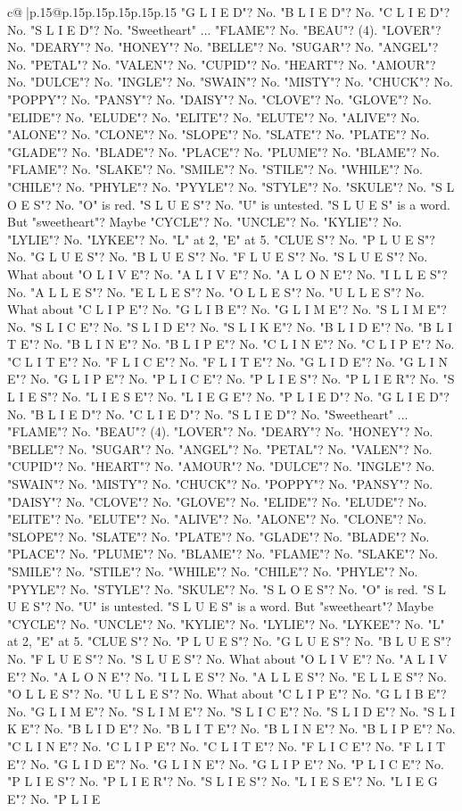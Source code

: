 \documentclass{article}
\begin{document}
{\begin{supertabular}{c@{$\;$}|p{.15\linewidth}@{}p{.15\linewidth}p{.15\linewidth}p{.15\linewidth}p{.15\linewidth}p{.15\linewidth}}
{{{"G L I E D"? No. "B L I E D"? No. "C L I E D"? No. "S L I E D"? No. "Sweetheart" ... "FLAME"? No. "BEAU"? (4). "LOVER"? No. "DEARY"? No. "HONEY"? No. "BELLE"? No. "SUGAR"? No. "ANGEL"? No. "PETAL"? No. "VALEN"? No. "CUPID"? No. "HEART"? No. "AMOUR"? No. "DULCE"? No. "INGLE"? No. "SWAIN"? No. "MISTY"? No. "CHUCK"? No. "POPPY"? No. "PANSY"? No. "DAISY"? No. "CLOVE"? No. "GLOVE"? No. "ELIDE"? No. "ELUDE"? No. "ELITE"? No. "ELUTE"? No. "ALIVE"? No. "ALONE"? No. "CLONE"? No. "SLOPE"? No. "SLATE"? No. "PLATE"? No. "GLADE"? No. "BLADE"? No. "PLACE"? No. "PLUME"? No. "BLAME"? No. "FLAME"? No. "SLAKE"? No. "SMILE"? No. "STILE"? No. "WHILE"? No. "CHILE"? No. "PHYLE"? No. "PYYLE"? No. "STYLE"? No. "SKULE"? No. "S L O E S"? No. "O" is red. "S L U E S"? No. "U" is untested. "S L U E S" is a word. But "sweetheart"? Maybe "CYCLE"? No. "UNCLE"? No. "KYLIE"? No. "LYLIE"? No. "LYKEE"? No. "L" at 2, "E" at 5. "CLUE S"? No. "P L U E S"? No. "G L U E S"? No. "B L U E S"? No. "F L U E S"? No. "S L U E S"? No. What about "O L I V E"? No. "A L I V E"? No. "A L O N E"? No. "I L L E S"? No. "A L L E S"? No. "E L L E S"? No. "O L L E S"? No. "U L L E S"? No. What about "C L I P E"? No. "G L I B E"? No. "G L I M E"? No. "S L I M E"? No. "S L I C E"? No. "S L I D E"? No. "S L I K E"? No. "B L I D E"? No. "B L I T E"? No. "B L I N E"? No. "B L I P E"? No. "C L I N E"? No. "C L I P E"? No. "C L I T E"? No. "F L I C E"? No. "F L I T E"? No. "G L I D E"? No. "G L I N E"? No. "G L I P E"? No. "P L I C E"? No. "P L I E S"? No. "P L I E R"? No. "S L I E S"? No. "L I E S E"? No. "L I E G E"? No. "P L I E D"? No. "G L I E D"? No. "B L I E D"? No. "C L I E D"? No. "S L I E D"? No. "Sweetheart" ... "FLAME"? No. "BEAU"? (4). "LOVER"? No. "DEARY"? No. "HONEY"? No. "BELLE"? No. "SUGAR"? No. "ANGEL"? No. "PETAL"? No. "VALEN"? No. "CUPID"? No. "HEART"? No. "AMOUR"? No. "DULCE"? No. "INGLE"? No. "SWAIN"? No. "MISTY"? No. "CHUCK"? No. "POPPY"? No. "PANSY"? No. "DAISY"? No. "CLOVE"? No. "GLOVE"? No. "ELIDE"? No. "ELUDE"? No. "ELITE"? No. "ELUTE"? No. "ALIVE"? No. "ALONE"? No. "CLONE"? No. "SLOPE"? No. "SLATE"? No. "PLATE"? No. "GLADE"? No. "BLADE"? No. "PLACE"? No. "PLUME"? No. "BLAME"? No. "FLAME"? No. "SLAKE"? No. "SMILE"? No. "STILE"? No. "WHILE"? No. "CHILE"? No. "PHYLE"? No. "PYYLE"? No. "STYLE"? No. "SKULE"? No. "S L O E S"? No. "O" is red. "S L U E S"? No. "U" is untested. "S L U E S" is a word. But "sweetheart"? Maybe "CYCLE"? No. "UNCLE"? No. "KYLIE"? No. "LYLIE"? No. "LYKEE"? No. "L" at 2, "E" at 5. "CLUE S"? No. "P L U E S"? No. "G L U E S"? No. "B L U E S"? No. "F L U E S"? No. "S L U E S"? No. What about "O L I V E"? No. "A L I V E"? No. "A L O N E"? No. "I L L E S"? No. "A L L E S"? No. "E L L E S"? No. "O L L E S"? No. "U L L E S"? No. What about "C L I P E"? No. "G L I B E"? No. "G L I M E"? No. "S L I M E"? No. "S L I C E"? No. "S L I D E"? No. "S L I K E"? No. "B L I D E"? No. "B L I T E"? No. "B L I N E"? No. "B L I P E"? No. "C L I N E"? No. "C L I P E"? No. "C L I T E"? No. "F L I C E"? No. "F L I T E"? No. "G L I D E"? No. "G L I N E"? No. "G L I P E"? No. "P L I C E"? No. "P L I E S"? No. "P L I E R"? No. "S L I E S"? No. "L I E S E"? No. "L I E G E"? No. "P L I E }}}
\end{supertabular}}
\end{document}

